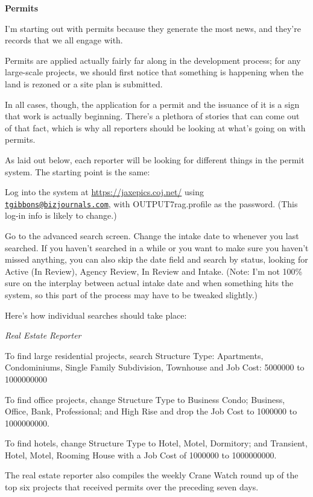 \documentclass[
  11pt,
  american,
  letterpaperpaper,
  extrafontsizes,onecolumn,openright
  ]{memoir}
\begin{document}
\textbf{Permits}

I'm starting out with permits because they generate the most news, and they're records that we all engage with.

Permits are applied actually fairly far along in the development process; for any large-scale projects, we should first notice that something is happening when the land is rezoned or a site plan is submitted.

In all cases, though, the application for a permit and the issuance of it is a sign that work is actually beginning. There's a plethora of stories that can come out of that fact, which is why all reporters should be looking at what's going on with permits.

As laid out below, each reporter will be looking for different things in the permit system. The starting point is the same:

Log into the system at \url{https://jaxepics.coj.net/} using \href{mailto:tgibbons@bizjournals.com}{\nolinkurl{tgibbons@bizjournals.com}}, with OUTPUT7rag.profile as the password. (This log-in info is likely to change.)

Go to the advanced search screen. Change the intake date to whenever you last searched. If you haven't searched in a while or you want to make sure you haven't missed anything, you can also skip the date field and search by status, looking for Active (In Review), Agency Review, In Review and Intake. (Note: I'm not 100\% sure on the interplay between actual intake date and when something hits the system, so this part of the process may have to be tweaked slightly.)

Here's how individual searches should take place:

\emph{Real Estate Reporter}

To find large residential projects, search Structure Type: Apartments, Condominiums, Single Family Subdivision, Townhouse and Job Cost: 5000000 to 1000000000

To find office projects, change Structure Type to Business Condo; Business, Office, Bank, Professional; and High Rise and drop the Job Cost to 1000000 to 1000000000.

To find hotels, change Structure Type to Hotel, Motel, Dormitory; and Transient, Hotel, Motel, Rooming House with a Job Cost of 1000000 to 1000000000.

The real estate reporter also compiles the weekly Crane Watch round up of the top six projects that received permits over the preceding seven days.
\end{document}
